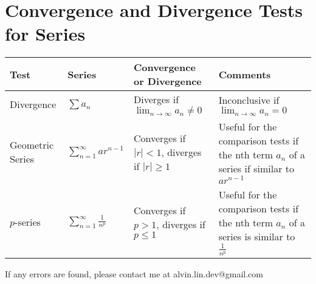 \documentclass[letterpaper, 12pt]{article}
\begin{document}
\section*{Convergence and Divergence Tests for Series}
\bgroup
  \def\arraystretch{2}
  \begin{tabular}{| m{2cm} | m{2cm} | m{5cm} | m{6cm} |}
    \hline
    Test & Series & Convergence or Divergence & Comments \\
    \hline
      Divergence &
      \( \sum{a_{n}} \) &
      Diverges if \( \lim_{n\to\infty}{a_{n}} \neq 0 \) &
      Inconclusive if \( \lim_{n\to\infty}{a_{n}} = 0 \) \\
    \hline
      Geometric Series &
      \( \sum_{n=1}^{\infty}{ar^{n-1}} \) &
      Converges if \( |r| < 1 \), diverges if \( |r| \geq 1 \) &
      Useful for the comparison tests if the nth term \( a_{n} \) of a series
        if similar to \( ar^{n-1} \) \\
    \hline
      \( p \)-series &
      \( \sum_{n=1}^{\infty}\frac{1}{n^{p}} \) &
      Converges if \( p > 1 \), diverges if \( p \leq 1 \) &
      Useful for the comparison tests if the nth term \( a_{n} \) of a series
      is similar to \( \frac{1}{n^{p}} \) \\
    \hline
  \end{tabular}
\egroup

\begin{center}
  If any errors are found, please contact me at alvin.lin.dev@gmail.com
\end{center}
\end{document}
